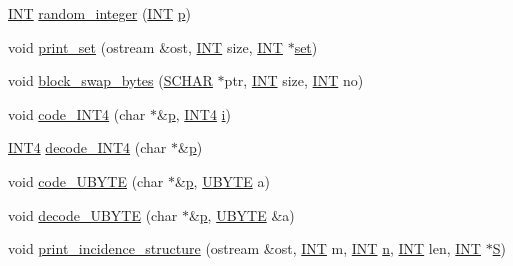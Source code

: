 \begin{DoxyCompactItemize}
\item 
\mbox{\hyperlink{galois_8h_a09fddde158a3a20bd2dcadb609de11dc}{I\+NT}} \mbox{\hyperlink{util_8_c_a509937846575424b1c8863e1bb96a766}{random\+\_\+integer}} (\mbox{\hyperlink{galois_8h_a09fddde158a3a20bd2dcadb609de11dc}{I\+NT}} \mbox{\hyperlink{alphabet2_8_c_a533391314665d6bf1b5575e9a9cd8552}{p}})
\item 
void \mbox{\hyperlink{util_8_c_a5cfa0b8a752874778b8fee3739ddaa1c}{print\+\_\+set}} (ostream \&ost, \mbox{\hyperlink{galois_8h_a09fddde158a3a20bd2dcadb609de11dc}{I\+NT}} size, \mbox{\hyperlink{galois_8h_a09fddde158a3a20bd2dcadb609de11dc}{I\+NT}} $\ast$\mbox{\hyperlink{nauty_8h_a9690bea211101f22a5e154087590c3da}{set}})
\item 
void \mbox{\hyperlink{util_8_c_a55c0738dadea7a508621f4af1e9ff8f3}{block\+\_\+swap\+\_\+bytes}} (\mbox{\hyperlink{galois_8h_a0d64bfd7d5423ee41bad9366e6e02ec6}{S\+C\+H\+AR}} $\ast$ptr, \mbox{\hyperlink{galois_8h_a09fddde158a3a20bd2dcadb609de11dc}{I\+NT}} size, \mbox{\hyperlink{galois_8h_a09fddde158a3a20bd2dcadb609de11dc}{I\+NT}} no)
\item 
void \mbox{\hyperlink{util_8_c_a77bf7a59ce7634a3328237f863fd1251}{code\+\_\+\+I\+N\+T4}} (char $\ast$\&\mbox{\hyperlink{alphabet2_8_c_a533391314665d6bf1b5575e9a9cd8552}{p}}, \mbox{\hyperlink{galois_8h_a6675ac57b948be915e03c09228b57b05}{I\+N\+T4}} \mbox{\hyperlink{alphabet2_8_c_acb559820d9ca11295b4500f179ef6392}{i}})
\item 
\mbox{\hyperlink{galois_8h_a6675ac57b948be915e03c09228b57b05}{I\+N\+T4}} \mbox{\hyperlink{util_8_c_a612dad0619e9870a91f364fb187abeb8}{decode\+\_\+\+I\+N\+T4}} (char $\ast$\&\mbox{\hyperlink{alphabet2_8_c_a533391314665d6bf1b5575e9a9cd8552}{p}})
\item 
void \mbox{\hyperlink{util_8_c_ab19ac74b5d294f8f631cf9280c38dfd6}{code\+\_\+\+U\+B\+Y\+TE}} (char $\ast$\&\mbox{\hyperlink{alphabet2_8_c_a533391314665d6bf1b5575e9a9cd8552}{p}}, \mbox{\hyperlink{galois_8h_a122c4acf389c050379f00341fdcd5812}{U\+B\+Y\+TE}} a)
\item 
void \mbox{\hyperlink{util_8_c_a100147d3ca1b1a594732c839eb78b753}{decode\+\_\+\+U\+B\+Y\+TE}} (char $\ast$\&\mbox{\hyperlink{alphabet2_8_c_a533391314665d6bf1b5575e9a9cd8552}{p}}, \mbox{\hyperlink{galois_8h_a122c4acf389c050379f00341fdcd5812}{U\+B\+Y\+TE}} \&a)
\item 
void \mbox{\hyperlink{util_8_c_aa7c640315296b0948ebccbfa731de5cf}{print\+\_\+incidence\+\_\+structure}} (ostream \&ost, \mbox{\hyperlink{galois_8h_a09fddde158a3a20bd2dcadb609de11dc}{I\+NT}} m, \mbox{\hyperlink{galois_8h_a09fddde158a3a20bd2dcadb609de11dc}{I\+NT}} \mbox{\hyperlink{simeon_8_c_a7f2cd26777ce0ff3fdaf8d02aacbddfb}{n}}, \mbox{\hyperlink{galois_8h_a09fddde158a3a20bd2dcadb609de11dc}{I\+NT}} len, \mbox{\hyperlink{galois_8h_a09fddde158a3a20bd2dcadb609de11dc}{I\+NT}} $\ast$\mbox{\hyperlink{simeon_8_c_adab47f8243f1b5a2c31df2535d6b37d0}{S}})

\end{DoxyCompactItemize}
